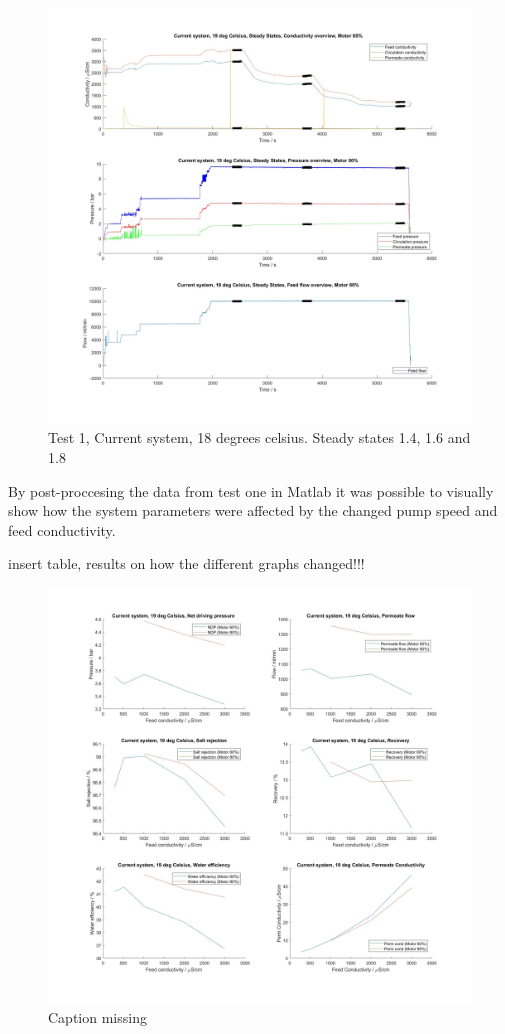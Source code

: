 \begin{figure}[H]
    \centering
    \includegraphics[width=1.1\textwidth]{overview20_80}
    \caption{Test 1, Current system, 18 degrees celsius. Steady states 1.4, 1.6 and 1.8}
    \label{fig:PressConn}
\end{figure}

\newpage

By post-proccesing the data from test one in Matlab it was possible to visually show how the system parameters were affected by the changed pump speed and feed conductivity. 


insert table, results on how the different graphs changed!!!

\begin{figure}[H]
    \centering
    \includegraphics[width=1.1\textwidth]{Key20}
    \caption{Caption missing}
    \label{fig:PressConn}
\end{figure}

